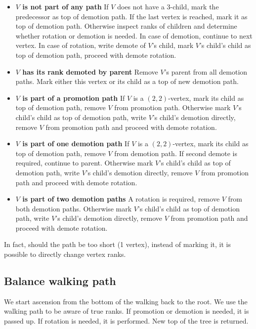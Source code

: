 \begin{itemize}

\item {\bfseries $V$ is not part of any path} If $V$ does not have a 3-child, mark the predecessor as top of demotion path. If the last vertex is reached, mark it as top of demotion path.  Otherwise inspect ranks of children and determine whether rotation or demotion is needed. In case of demotion, continue to next vertex. In case of rotation, write demote of $V$'s child, mark $V$'s child's child as top of demotion path, proceed with demote rotation.

\item {\bfseries $V$ has its rank demoted by parent} Remove $V$'s parent from all demotion paths. Mark either this vertex or its child as a top of new demotion path.

\item {\bfseries $V$ is part of a promotion path} If $V$ is a $(2,2)$-vertex, mark its child as top of demotion path, remove $V$ from promotion path. Otherwise mark $V$'s child's child as top of demotion path, write $V$'s child's demotion directly, remove $V$ from promotion path and proceed with demote rotation. 

\item {\bfseries $V$ is part of one demotion path} If $V$ is a $(2,2)$-vertex, mark its child as top of demotion path, remove $V$ from demotion path. If second demote is required, continue to parent. Otherwise mark $V$'s child's child as top of demotion path, write $V$'s child's demotion directly, remove $V$ from promotion path and proceed with demote rotation. 

\item {\bfseries $V$ is part of two demotion paths} A rotation is required, remove $V$ from both demotion paths. Otherwise mark $V$'s child's child as top of demotion path, write $V$'s child's demotion directly, remove $V$ from promotion path and proceed with demote rotation.

\end{itemize}

In fact, should the path be too short (1 vertex), instead of marking it, it is possible to directly change vertex ranks.

\subsection{Balance walking path}

We start ascension from the bottom of the walking back to the root. We use the walking path to be aware of true ranks. If promotion or demotion is needed, it is passed up. If rotation is needed, it is performed. New top of the tree is returned. 

